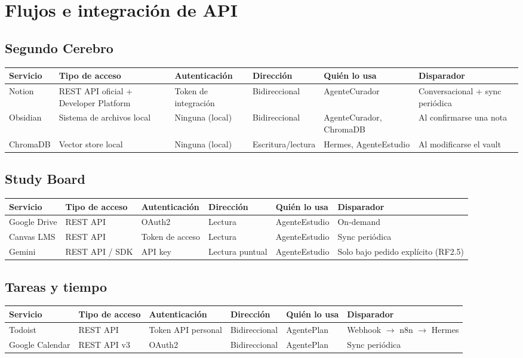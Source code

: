 \documentclass[11pt,a4paper]{article}
\begin{document}
\section{Flujos e integración de API}

\subsection*{Segundo Cerebro}
\begin{tabularx}{\textwidth}{@{}p{2cm}p{2.2cm}p{2.1cm}p{2.9cm}p{2.2cm}X@{}}
\toprule
Servicio & Tipo de acceso & Autenticación & Dirección & Quién lo usa & Disparador \\
\midrule
Notion & REST API oficial + Developer Platform & Token de integración & Bidireccional & AgenteCurador & Conversacional + sync periódica \\
Obsidian & Sistema de archivos local & Ninguna (local) & Bidireccional & AgenteCurador, ChromaDB & Al confirmarse una nota \\
ChromaDB & Vector store local & Ninguna (local) & Escritura/lectura & Hermes, AgenteEstudio & Al modificarse el vault \\
\bottomrule
\end{tabularx}

\vspace{0.4cm}
\subsection*{Study Board}
\begin{tabularx}{\textwidth}{@{}p{2cm}p{2.2cm}p{2.1cm}p{2.9cm}p{2.2cm}X@{}}
\toprule
Servicio & Tipo de acceso & Autenticación & Dirección & Quién lo usa & Disparador \\
\midrule
Google Drive & REST API & OAuth2 & Lectura & AgenteEstudio & On-demand \\
Canvas LMS & REST API & Token de acceso & Lectura & AgenteEstudio & Sync periódica \\
Gemini & REST API / SDK & API key & Lectura puntual & AgenteEstudio & Solo bajo pedido explícito (RF2.5) \\
\bottomrule
\end{tabularx}

\vspace{0.4cm}
\subsection*{Tareas y tiempo}
\begin{tabularx}{\textwidth}{@{}p{2cm}p{2.2cm}p{2.1cm}p{2.9cm}p{2.2cm}X@{}}
\toprule
Servicio & Tipo de acceso & Autenticación & Dirección & Quién lo usa & Disparador \\
\midrule
Todoist & REST API & Token API personal & Bidireccional & AgentePlan & Webhook $\to$ n8n $\to$ Hermes \\
Google Calendar & REST API v3 & OAuth2 & Bidireccional & AgentePlan & Sync periódica \\
\bottomrule
\end{tabularx}
\end{document}
